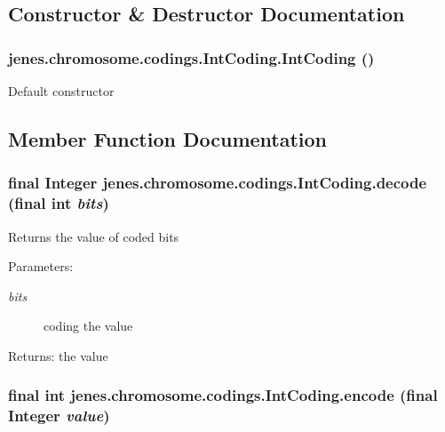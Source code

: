 \subsection{Constructor \& Destructor Documentation}
\hypertarget{classjenes_1_1chromosome_1_1codings_1_1_int_coding_f99166e5452fdf789dc235ce473872c9}{
\subsubsection[IntCoding]{\setlength{\rightskip}{0pt plus 5cm}jenes.chromosome.codings.IntCoding.IntCoding ()}}
\label{classjenes_1_1chromosome_1_1codings_1_1_int_coding_f99166e5452fdf789dc235ce473872c9}


Default constructor 

\subsection{Member Function Documentation}
\hypertarget{classjenes_1_1chromosome_1_1codings_1_1_int_coding_2097eb05c6efc1572e07d23709f2f4f7}{
\subsubsection[decode]{\setlength{\rightskip}{0pt plus 5cm}final Integer jenes.chromosome.codings.IntCoding.decode (final int {\em bits})}}
\label{classjenes_1_1chromosome_1_1codings_1_1_int_coding_2097eb05c6efc1572e07d23709f2f4f7}


Returns the value of coded bits

\begin{Desc}
\item[Parameters:]
\begin{description}
\item[{\em bits}]coding the value \end{description}
\end{Desc}
\begin{Desc}
\item[Returns:]the value \end{Desc}
\hypertarget{classjenes_1_1chromosome_1_1codings_1_1_int_coding_b320730ca00ec9be8d2e7e52f3bdb8eb}{
\subsubsection[encode]{\setlength{\rightskip}{0pt plus 5cm}final int jenes.chromosome.codings.IntCoding.encode (final Integer {\em value})}}
\label{classjenes_1_1chromosome_1_1codings_1_1_int_coding_b320730ca00ec9be8d2e7e52f3bdb8eb}


